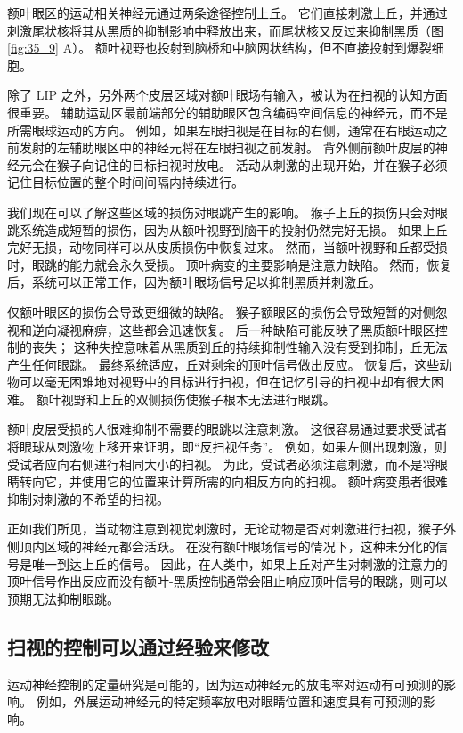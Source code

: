 额叶眼区的运动相关神经元通过两条途径控制上丘。 它们直接刺激上丘，并通过刺激尾状核将其从黑质的抑制影响中释放出来，而尾状核又反过来抑制黑质（图 \ref{fig:35_9} A）。 额叶视野也投射到脑桥和中脑网状结构，但不直接投射到爆裂细胞。

除了 LIP 之外，另外两个皮层区域对额叶眼场有输入，被认为在扫视的认知方面很重要。 辅助运动区最前端部分的辅助眼区包含编码空间信息的神经元，而不是所需眼球运动的方向。 例如，如果左眼扫视是在目标的右侧，通常在右眼运动之前发射的左辅助眼区中的神经元将在左眼扫视之前发射。 背外侧前额叶皮层的神经元会在猴子向记住的目标扫视时放电。 活动从刺激的出现开始，并在猴子必须记住目标位置的整个时间间隔内持续进行。

我们现在可以了解这些区域的损伤对眼跳产生的影响。 猴子上丘的损伤只会对眼跳系统造成短暂的损伤，因为从额叶视野到脑干的投射仍然完好无损。 如果上丘完好无损，动物同样可以从皮质损伤中恢复过来。 然而，当额叶视野和丘都受损时，眼跳的能力就会永久受损。 顶叶病变的主要影响是注意力缺陷。 然而，恢复后，系统可以正常工作，因为额叶眼场信号足以抑制黑质并刺激丘。

仅额叶眼区的损伤会导致更细微的缺陷。 猴子额眼区的损伤会导致短暂的对侧忽视和逆向凝视麻痹，这些都会迅速恢复。 后一种缺陷可能反映了黑质额叶眼区控制的丧失； 这种失控意味着从黑质到丘的持续抑制性输入没有受到抑制，丘无法产生任何眼跳。 最终系统适应，丘对剩余的顶叶信号做出反应。 恢复后，这些动物可以毫无困难地对视野中的目标进行扫视，但在记忆引导的扫视中却有很大困难。 额叶视野和上丘的双侧损伤使猴子根本无法进行眼跳。

额叶皮层受损的人很难抑制不需要的眼跳以注意刺激。 这很容易通过要求受试者将眼球从刺激物上移开来证明，即“反扫视任务”。 例如，如果左侧出现刺激，则受试者应向右侧进行相同大小的扫视。 为此，受试者必须注意刺激，而不是将眼睛转向它，并使用它的位置来计算所需的向相反方向的扫视。 额叶病变患者很难抑制对刺激的不希望的扫视。

正如我们所见，当动物注意到视觉刺激时，无论动物是否对刺激进行扫视，猴子外侧顶内区域的神经元都会活跃。 在没有额叶眼场信号的情况下，这种未分化的信号是唯一到达上丘的信号。 因此，在人类中，如果上丘对产生对刺激的注意力的顶叶信号作出反应而没有额叶-黑质控制通常会阻止响应顶叶信号的眼跳，则可以预期无法抑制眼跳。

\subsection{扫视的控制可以通过经验来修改}
运动神经控制的定量研究是可能的，因为运动神经元的放电率对运动有可预测的影响。 例如，外展运动神经元的特定频率放电对眼睛位置和速度具有可预测的影响。

